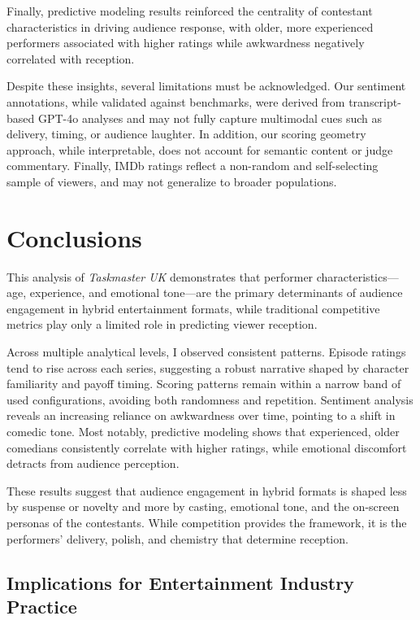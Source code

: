 \documentclass[10pt,letterpaper]{article}
\begin{document}
Finally, predictive modeling results reinforced the centrality of contestant characteristics in driving audience response, with older, more experienced performers associated with higher ratings while awkwardness negatively correlated with reception.

Despite these insights, several limitations must be acknowledged. Our sentiment annotations, while validated against benchmarks, were derived from transcript-based GPT-4o analyses and may not fully capture multimodal cues such as delivery, timing, or audience laughter. In addition, our scoring geometry approach, while interpretable, does not account for semantic content or judge commentary. Finally, IMDb ratings reflect a non-random and self-selecting sample of viewers, and may not generalize to broader populations.


\section*{Conclusions}

This analysis of \textit{Taskmaster UK} demonstrates that performer characteristics—age, experience, and emotional tone—are the primary determinants of audience engagement in hybrid entertainment formats, while traditional competitive metrics play only a limited role in predicting viewer reception.

Across multiple analytical levels, I observed consistent patterns. Episode ratings tend to rise across each series, suggesting a robust narrative shaped by character familiarity and payoff timing. Scoring patterns remain within a narrow band of used configurations, avoiding both randomness and repetition. Sentiment analysis reveals an increasing reliance on awkwardness over time, pointing to a shift in comedic tone. Most notably, predictive modeling shows that experienced, older comedians consistently correlate with higher ratings, while emotional discomfort detracts from audience perception.

These results suggest that audience engagement in hybrid formats is shaped less by suspense or novelty and more by casting, emotional tone, and the on-screen personas of the contestants. While competition provides the framework, it is the performers’ delivery, polish, and chemistry that determine reception.

\subsection*{Implications for Entertainment Industry Practice}
\end{document}

